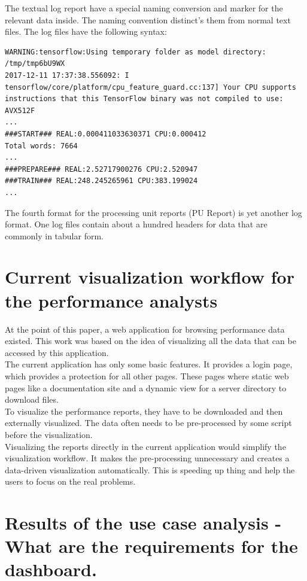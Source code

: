 \documentclass[american,a4paper,oneside,,tablecaptionabove]{scrbook}
\begin{document}
The textual log report have a special naming conversion and marker for
the relevant data inside. The naming convention distinct's them from
normal text files. The log files have the following syntax:

\begin{lstlisting}[caption={Logfile for Tensorflow tests}]
WARNING:tensorflow:Using temporary folder as model directory: /tmp/tmp6bU9WX
2017-12-11 17:37:38.556092: I tensorflow/core/platform/cpu_feature_guard.cc:137] Your CPU supports instructions that this TensorFlow binary was not compiled to use: AVX512F
...
###START### REAL:0.000411033630371 CPU:0.000412
Total words: 7664
...
###PREPARE### REAL:2.52717900276 CPU:2.520947
###TRAIN### REAL:248.245265961 CPU:383.199024
...
\end{lstlisting}

The fourth format for the processing unit reports (PU Report) is yet
another log format. One log files contain about a hundred headers for
data that are commonly in tabular form.

\section{Current visualization workflow for the performance
analysts}\label{current-visualization-workflow-for-the-performance-analysts}

At the point of this paper, a web application for browsing performance
data existed. This work was based on the idea of visualizing all the
data that can be accessed by this application.\\
The current application has only some basic features. It provides a
login page, which provides a protection for all other pages. These pages
where static web pages like a documentation site and a dynamic view for
a server directory to download files.\\
To visualize the performance reports, they have to be downloaded and
then externally visualized. The data often needs to be pre-processed by
some script before the visualization.\\
Visualizing the reports directly in the current application would
simplify the visualization workflow. It makes the pre-processing
unnecessary and creates a data-driven visualization automatically. This
is speeding up thing and help the users to focus on the real problems.

\section{Results of the use case analysis - What are the requirements
for the dashboard.}\label{sec:usecase-result}
\end{document}
